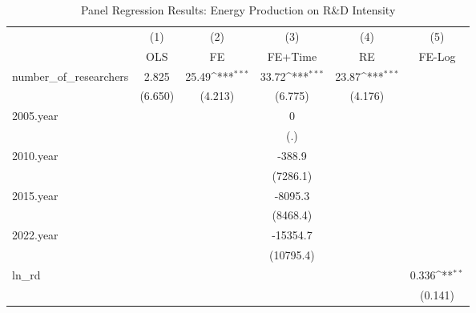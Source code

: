 \begin{table}[htbp]\centering
\def\sym#1{\ifmmode^{#1}\else\(^{#1}\)\fi}
\caption{Panel Regression Results: Energy Production on R&D Intensity}
\begin{tabular}{l*{5}{c}}
\toprule
            &\multicolumn{1}{c}{(1)}&\multicolumn{1}{c}{(2)}&\multicolumn{1}{c}{(3)}&\multicolumn{1}{c}{(4)}&\multicolumn{1}{c}{(5)}\\
            &\multicolumn{1}{c}{OLS}&\multicolumn{1}{c}{FE}&\multicolumn{1}{c}{FE+Time}&\multicolumn{1}{c}{RE}&\multicolumn{1}{c}{FE-Log}\\
\midrule
number\_of\_researchers&       2.825         &       25.49\sym{***}&       33.72\sym{***}&       23.87\sym{***}&                     \\
            &     (6.650)         &     (4.213)         &     (6.775)         &     (4.176)         &                     \\
\addlinespace
2005.year   &                     &                     &           0         &                     &                     \\
            &                     &                     &         (.)         &                     &                     \\
\addlinespace
2010.year   &                     &                     &      -388.9         &                     &                     \\
            &                     &                     &    (7286.1)         &                     &                     \\
\addlinespace
2015.year   &                     &                     &     -8095.3         &                     &                     \\
            &                     &                     &    (8468.4)         &                     &                     \\
\addlinespace
2022.year   &                     &                     &    -15354.7         &                     &                     \\
            &                     &                     &   (10795.4)         &                     &                     \\
\addlinespace
ln\_rd       &                     &                     &                     &                     &       0.336\sym{**} \\
            &                     &                     &                     &                     &     (0.141)         \\

\end{tabular}
\end{table}
